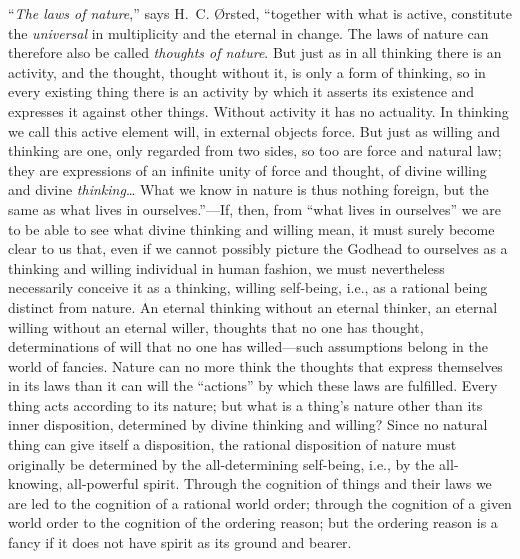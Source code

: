 \documentclass[12pt,a4paper,openany]{book}
\newcommand{\opage}[1]{\marginnote{\footnotesize\textit{[#1]}}}
\begin{document}
``\emph{The laws of nature},'' says H.~C. Ørsted, ``together with what is
active, constitute the \emph{universal} in \opage{13}multiplicity and the eternal in
change. The laws of nature can therefore also be called \emph{thoughts of
nature}. But just as in all thinking there is an activity, and the
thought, thought without it, is only a form of thinking, so in every
existing thing there is an activity by which it asserts its existence and
expresses it against other things. Without activity it has no actuality.
In thinking we call this active element will, in external objects force.
But just as willing and thinking are one, only regarded from two sides,
so too are force and natural law; they are expressions of an infinite
unity of force and thought, of divine willing and divine
\emph{thinking}\dots{} What we know in nature is thus nothing foreign,
but the same as what lives in ourselves.''---If, then, from ``what lives
in ourselves'' we are to be able to see what divine thinking and willing
mean, it must surely become clear to us that, even if we cannot possibly
picture the Godhead to ourselves as a thinking and willing individual in
human fashion, we must nevertheless necessarily conceive it as a
thinking, willing self-being, i.e., as a rational being distinct from
nature. An eternal thinking without an eternal thinker, an eternal
willing without an eternal willer, thoughts that no one has thought,
determinations of will that no one has willed---such assumptions belong
in the world of fancies. Nature can no more think the thoughts that
express themselves in its laws than it can will the ``actions'' by which
these laws are fulfilled. Every thing acts according to its nature; but
what is a thing's nature other than its inner disposition, determined by
divine thinking and willing? Since no natural thing can give itself a
disposition, \opage{14}the rational disposition of nature must originally be
determined by the all-determining self-being, i.e., by the all-knowing,
all-powerful spirit. Through the cognition of things and their laws we
are led to the cognition of a rational world order; through the cognition
of a given world order to the cognition of the ordering reason; but the
ordering reason is a fancy if it does not have spirit as its ground and
bearer.
\end{document}

